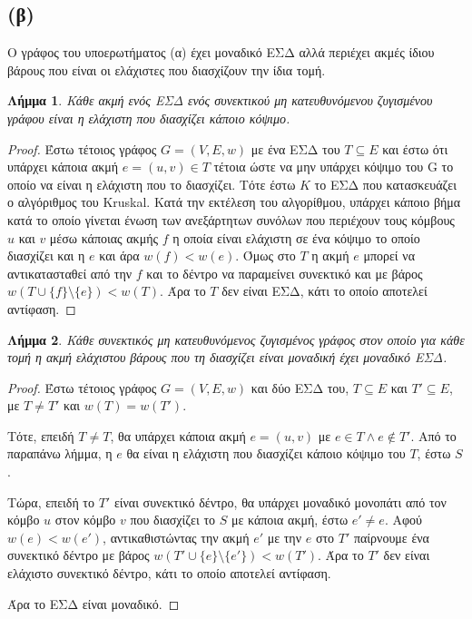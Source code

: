 \documentclass[11pt,a4paper,oneside]{report}
\newtheorem*{lemma}{Λήμμα}
\begin{document}
\subsection*{(β)}
Ο γράφος του υποερωτήματος (α) έχει μοναδικό ΕΣΔ αλλά περιέχει ακμές ίδιου βάρους που είναι οι ελάχιστες που διασχίζουν την ίδια τομή.

\begin{lemma}
Κάθε ακμή ενός ΕΣΔ ενός συνεκτικού μη κατευθυνόμενου ζυγισμένου γράφου είναι η ελάχιστη που διασχίζει κάποιο κόψιμο.
\end{lemma}
\begin{proof}
Έστω τέτοιος γράφος $G = (V, E, w)$ με ένα ΕΣΔ του $T \subseteq E$ και έστω ότι υπάρχει κάποια ακμή $e = (u, v) \in T$ τέτοια ώστε να μην υπάρχει κόψιμο του G το οποίο να είναι η ελάχιστη που το διασχίζει. Τότε έστω $K$ το ΕΣΔ που κατασκευάζει ο αλγόριθμος του \textlatin{Kruskal}. Κατά την εκτέλεση του αλγορίθμου, υπάρχει κάποιο βήμα κατά το οποίο γίνεται ένωση των ανεξάρτητων συνόλων που περιέχουν τους κόμβους $u$ και $v$ μέσω κάποιας ακμής $f$ η οποία είναι ελάχιστη σε ένα κόψιμο το οποίο διασχίζει και η $e$ και άρα $w(f) < w(e)$. Όμως στο $T$ η ακμή $e$ μπορεί να αντικατασταθεί από την $f$ και το δέντρο να παραμείνει συνεκτικό και με βάρος $w( T \cup \{f\} \setminus \{e\}) < w( T )$. Άρα το $T$ δεν είναι ΕΣΔ, κάτι το οποίο αποτελεί αντίφαση.
\end{proof}

\begin{lemma}
Κάθε συνεκτικός μη κατευθυνόμενος ζυγισμένος γράφος στον οποίο για κάθε τομή η ακμή ελάχιστου βάρους που τη διασχίζει είναι μοναδική έχει μοναδικό ΕΣΔ.
\end{lemma}
\begin{proof}
Έστω τέτοιος γράφος $G = (V, E, w)$ και δύο ΕΣΔ του, $T \subseteq E$ και $T' \subseteq E$,
με $T \neq T'$ και $w(T) = w(T')$.

Τότε, επειδή $T \neq T$, θα υπάρχει κάποια ακμή $e = (u, v)$ με $e \in T \land e \not\in T'$. Από το παραπάνω λήμμα, η $e$ θα είναι η ελάχιστη που διασχίζει κάποιο κόψιμο του $T$, έστω $S$.

Τώρα, επειδή το $T'$ είναι συνεκτικό δέντρο, θα υπάρχει μοναδικό μονοπάτι από τον κόμβο $u$ στον κόμβο $v$ που διασχίζει το $S$ με κάποια ακμή, έστω $e' \neq e$. Αφού $w(e) < w(e')$, αντικαθιστώντας την ακμή $e'$ με την $e$ στο $T'$ παίρνουμε ένα συνεκτικό δέντρο με βάρος $w(T' \cup\{e\} \setminus \{e'\}) < w(T')$. Άρα το $T'$ δεν είναι ελάχιστο συνεκτικό δέντρο, κάτι το οποίο αποτελεί αντίφαση.

Άρα το ΕΣΔ είναι μοναδικό.
\end{proof}
\end{document}
